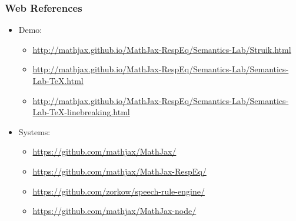 \documentclass{beamer}
\begin{document}
\begin{frame}
  \frametitle{Web References}


  \begin{itemize}
  \item Demo:
    \begin{itemize}
    \item \url{http://mathjax.github.io/MathJax-RespEq/Semantics-Lab/Struik.html}
    \item \url{http://mathjax.github.io/MathJax-RespEq/Semantics-Lab/Semantics-Lab-TeX.html}
    \item \url{http://mathjax.github.io/MathJax-RespEq/Semantics-Lab/Semantics-Lab-TeX-linebreaking.html}
    \end{itemize}
  \item Systems:
    \begin{itemize}
    \item \url{https://github.com/mathjax/MathJax/}
    \item \url{https://github.com/mathjax/MathJax-RespEq/}
    \item \url{https://github.com/zorkow/speech-rule-engine/}
    \item \url{https://github.com/mathjax/MathJax-node/}
    \end{itemize}
  \end{itemize}
\end{frame}
\end{document}
